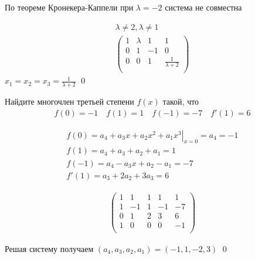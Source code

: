 \begin{sol}
По теореме Кронекера-Каппели при $\lambda = -2$ система не совместна

\begin{gather*}
    \lambda \neq 2, \lambda \neq 1\\
    \left(
    \begin{array}{ccc|c}
     1 & \lambda & 1 & 1 \\
     0 & 1 & -1 & 0 \\
     0 & 0 & 1 & \frac{1}{\lambda + 2}\\
    \end{array}
    \right)
\end{gather*}
$x_1 = x_2 = x_3 = \frac{1}{\lambda + 2}$
\qed
\end{sol}

\begin{prb}
Найдите многочлен третьей степени $f(x)$ такой, что
\begin{gather*}
    f(0) = -1 \quad 
    f(1) = 1 \quad
    f(-1) = -7 \quad
    f'(1) = 6
\end{gather*}
\end{prb}

\begin{sol}
\begin{gather*}
   \left. f(0) = a_4 + a_3 x + a_2 x^2 + a_1 x^3 \right\vert_{x = 0} = a_4 = -1 \\
   f(1) = a_4 + a_3 + a_2 + a_1 = 1 \\
   f(-1) = a_4 - a_3 x + a_2 -  a_1 = -7 \\
   f'(1) =  a_3 + 2 a_2 + 3 a_3  = 6
\end{gather*}

\begin{gather*}
    \left(
    \begin{array}{cccc|c}
     1 & 1 & 1 & 1 & 1 \\
     1 & -1 & 1 & -1 & -7 \\
     0 & 1 & 2 & 3 & 6 \\
     1 & 0 & 0 & 0 & -1 \\
    \end{array}
    \right)
\end{gather*}

Решая систему получаем $\left(a_4, a_3, a_2, a_1\right) = \left(-1, 1, -2, 3\right)$
\qed
\end{sol}